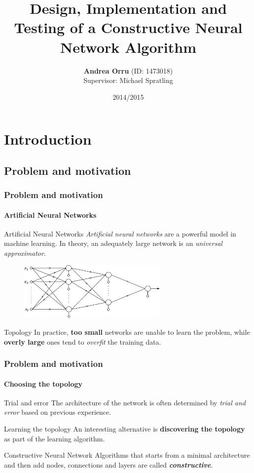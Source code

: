 \documentclass{beamer}
\title[Implementation of a Constructive Neural Network]{Design, Implementation and Testing of a Constructive Neural Network Algorithm}
\author[Andrea Orru]{\textbf{Andrea Orru} \small{(ID: 1473018)} \\ \small{Supervisor: Michael Spratling}}
\institute[King's College London]{Department of Informatics \\ King's College London}
\date{2014/2015}
\begin{document}
	\frame{\titlepage}
	
	\section{Introduction}
		\subsection{Problem and motivation}
			\begin{frame}
				\frametitle{Problem and motivation}
				\framesubtitle{Artificial Neural Networks}
				\begin{block}{Artificial Neural Networks}
					\emph{Artificial neural networks} are a powerful model in machine learning. In theory, an adequately large network is an \emph{universal approximator}.
				\end{block}
				\begin{figure}[h]
					\centering
					\includegraphics[width=0.65\textwidth]{multilayer}
				\end{figure}
				\begin{alertblock}{Topology}
					In practice, \textbf{too small} networks are unable to learn the problem, while \textbf{overly large} ones tend to \emph{overfit} the training data.
				\end{alertblock}
			\end{frame}
			
			\begin{frame}
				\frametitle{Problem and motivation}
				\framesubtitle{Choosing the topology}
				\begin{block}{Trial and error}
					The architecture of the network is often determined by \emph{trial and error} based on previous experience.
				\end{block}
				\begin{block}{Learning the topology}
					An interesting alternative is \textbf{discovering the topology} as part of the learning algorithm.
				\end{block}
				\begin{exampleblock}{Constructive Neural Network}
					Algorithms that starts from a minimal architecture and then add nodes, connections and layers are called \textbf{\emph{constructive}}.
				\end{exampleblock}
			\end{frame}
			
\end{document}
